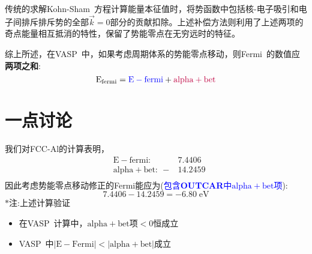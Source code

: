 \documentclass{article}      %
\begin{document}
传统的求解\textrm{Kohn-Sham~}方程计算能量本征值时，将势函数中包括核-电子吸引和电子间排斥排斥势的全部$\vec k=0$部分的贡献扣除。上述补偿方法则利用了上述两项的奇点能量相互抵消的特性，保留了势能零点在无穷远时的特征。

综上所述，在\textrm{VASP~}中，如果考虑周期体系的势能零点移动，则\textrm{Fermi~}的数值应\textbf{两项之和}:~
\begin{displaymath}
	\mathrm{E_{fermi}}=\textcolor{blue}{\mathrm{E-fermi}}+\textcolor{purple}{\mathrm{alpha+bet}}
\end{displaymath}

\section{一点讨论}
我们对\textrm{FCC-Al}的计算表明，
\begin{displaymath}
	\begin{aligned}
	&\mathrm{E-fermi}:~&7.4406\\
	&\mathrm{alpha+bet}:~-&14.2459\\
	\end{aligned}
\end{displaymath}
因此考虑势能零点移动修正的\textrm{Fermi}能应为(\textcolor{blue}{包含\textbf{OUTCAR}中$\mathrm{alpha+bet}$项}):
\begin{displaymath}
	7.4406-14.2459=-6.80\;\mathrm{eV}
\end{displaymath}
$\ast$注:上述计算验证~
\begin{itemize}
	\item 在\textrm{VASP~}计算中，$\mathrm{alpha+bet\mbox{项}}<0$恒成立
	\item \textrm{VASP~}中$|\mathrm{E-Fermi}|<|\mathrm{alpha+bet}|$成立
\end{itemize}
\end{document}
